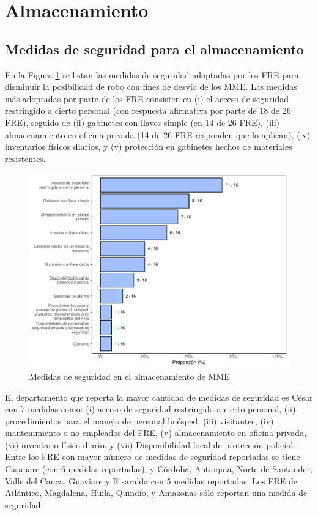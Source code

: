 \documentclass[
]{book}
\begin{document}
\hypertarget{almacenamiento}{%
\section{Almacenamiento}\label{almacenamiento}}

\hypertarget{medidas-de-seguridad-para-el-almacenamiento}{%
\subsection{Medidas de seguridad para el almacenamiento}\label{medidas-de-seguridad-para-el-almacenamiento}}

En la Figura \ref{fig:MedidasSeguridadAlmacenamientoMME} se listan las medidas de seguridad adoptadas por los FRE para disminuir la posibilidad de robo con fines de desvío de los MME. Las medidas más adoptadas por parte de los FRE consisten en (i) el acceso de seguridad restringido a cierto personal (con respuesta afirmativa por parte de 18 de 26 FRE), seguido de (ii) gabinetes con llaves simple (en 14 de 26 FRE), (iii) almacenamiento en oficina privada (14 de 26 FRE responden que lo aplican), (iv) inventarios físicos diarios, y (v) protección en gabinetes hechos de materiales resistentes.

\begin{figure}
\includegraphics[width=0.9\linewidth]{InformeFinal_files/figure-latex/MedidasSeguridadAlmacenamientoMME-1} \caption{Medidas de seguridad en el almacenamiento de MME}\label{fig:MedidasSeguridadAlmacenamientoMME}
\end{figure}

El departamento que reporta la mayor cantidad de medidas de seguridad es César con 7 medidas como: (i) acceso de seguridad restringido a cierto personal, (ii) procedimientos para el manejo de personal huésped, (iii) visitantes, (iv) mantenimiento o no empleados del FRE, (v) almacenamiento en oficina privada, (vi) inventario físico diario, y (vii) Disponibilidad local de protección policial. Entre los FRE con mayor número de medidas de seguridad reportadas se tiene Casanare (con 6 medidas reportadas), y Córdoba, Antioquia, Norte de Santander, Valle del Cauca, Guaviare y Risaralda con 5 medidas reportadas. Los FRE de Atlántico, Magdalena, Huila, Quindío, y Amazonas sólo reportan una medida de seguridad.
\end{document}
